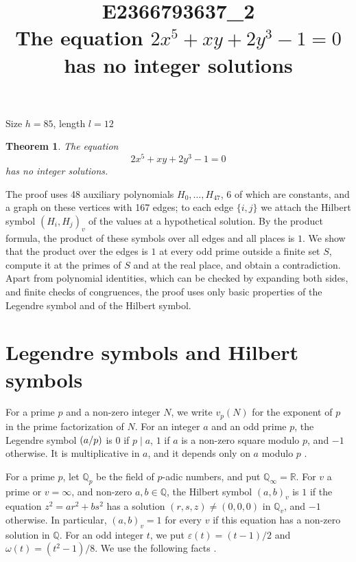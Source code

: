 \documentclass[11pt]{article}
\title{\textbf{E2366793637\_2}\\[4pt] {\Large The equation $2x^{5}+xy+2y^{3}-1=0$ has no integer solutions}}
\author{}
\date{}
\newtheorem{theorem}{Theorem}
\newcommand{\Q}{\mathbb{Q}}
\newcommand{\leg}[2]{\mathchoice{\biggl(\dfrac{#1}{#2}\biggr)}{(#1/#2)}{(#1/#2)}{(#1/#2)}}
\begin{document}
\maketitle
\vspace{-8ex}
\begin{center}
Size $h=85$, length $l=12$
\end{center}

\begin{theorem}\label{thm:main}
The equation
\begin{equation}\label{eq:main}
2x^{5}+xy+2y^{3}-1=0
\end{equation}
has no integer solutions.
\end{theorem}

The proof uses 48 auxiliary polynomials $H_0,\dots,H_{47}$, 6 of which are constants, and a graph on these vertices with 167 edges; to each edge $\{i,j\}$ we attach the Hilbert symbol $(H_i,H_j)_v$ of the values at a hypothetical solution. By the product formula, the product of these symbols over all edges and all places is $1$. We show that the product over the edges is $1$ at every odd prime outside a finite set $S$, compute it at the primes of $S$ and at the real place, and obtain a contradiction. Apart from polynomial identities, which can be checked by expanding both sides, and finite checks of congruences, the proof uses only basic properties of the Legendre symbol and of the Hilbert symbol.

\section{Legendre symbols and Hilbert symbols}

For a prime $p$ and a non-zero integer $N$, we write $v_p(N)$ for the exponent of $p$ in the prime factorization of $N$. For an integer $a$ and an odd prime $p$, the Legendre symbol $\leg{a}{p}$ is $0$ if $p\mid a$, $1$ if $a$ is a non-zero square modulo $p$, and $-1$ otherwise. It is multiplicative in $a$, and it depends only on $a$ modulo $p$ \cite[Chapter~5]{IR}.

For a prime $p$, let $\Q_p$ be the field of $p$-adic numbers, and put $\Q_\infty=\mathbb R$. For $v$ a prime or $v=\infty$, and non-zero $a,b\in\Q$, the Hilbert symbol $(a,b)_v$ is $1$ if the equation $z^2=ar^2+bs^2$ has a solution $(r,s,z)\neq(0,0,0)$ in $\Q_v$, and $-1$ otherwise. In particular, $(a,b)_v=1$ for every $v$ if this equation has a non-zero solution in $\Q$. For an odd integer $t$, we put $\varepsilon(t)=(t-1)/2$ and $\omega(t)=(t^2-1)/8$. We use the following facts \cite[Chapter~III, Proposition~2 and Theorems~1 and~3]{Se}.
\end{document}
